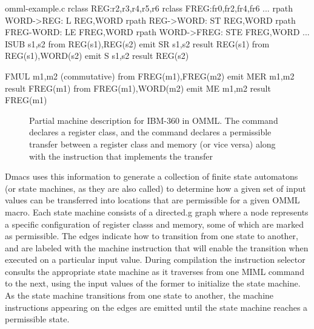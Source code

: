 \begin{filecontents*}{omml-example.c}
rclass REG:r2,r3,r4,r5,r6
rclass FREG:fr0,fr2,fr4,fr6
...
rpath WORD->REG: L REG,WORD
rpath REG->WORD: ST REG,WORD
rpath FREG-WORD: LE FREG,WORD
rpath WORD->FREG: STE FREG,WORD
...
ISUB s1,s2
from REG(s1),REG(s2) emit SR s1,s2  result REG(s1)
from REG(s1),WORD(s2) emit S s1,s2  result REG(s2)

FMUL m1,m2 (commutative)
from FREG(m1),FREG(m2) emit MER m1,m2  result FREG(m1)
from FREG(m1),WORD(m2) emit ME m1,m2   result FREG(m1)
\end{filecontents*}
%
\begin{figure}%
  \centering%
  \begin{minipage}{9.2cm}%
  \end{minipage}

  \caption[OMML example]%
          {%
            Partial machine description for IBM-360 in OMML.
            The  command declares a register class, and the
             command declares a permissible transfer between a
            register class and memory (or vice versa) along with the instruction
            that implements the transfer~\cite{Miller:1971}%
          }
\end{figure}

\gls{Dmacs} uses this information to generate a collection of \glspl{finite
  state automaton} (or \glspl{state machine}, as they are also called) to
determine how a given set of input values can be transferred into locations that
are permissible for a given \gls{OMML} \gls{macro}.
%
Each \gls{state machine} consists of a \gls{directed.g} \gls{graph} where a
\gls{node} represents a specific configuration of \glspl{register class} and
memory, some of which are marked as permissible.
%
The edges indicate how to transition from one state to another, and are labeled
with the machine instruction that will enable the transition when executed on a
particular input value.
%
During compilation the \gls{instruction selector} consults the appropriate
\gls{state machine} as it traverses from one \gls{MIML} command to the next,
using the input values of the former to initialize the \gls{state machine}.
%
As the \gls{state machine} transitions from one state to another, the machine
instructions appearing on the edges are emitted until the \gls{state machine}
reaches a permissible state.

